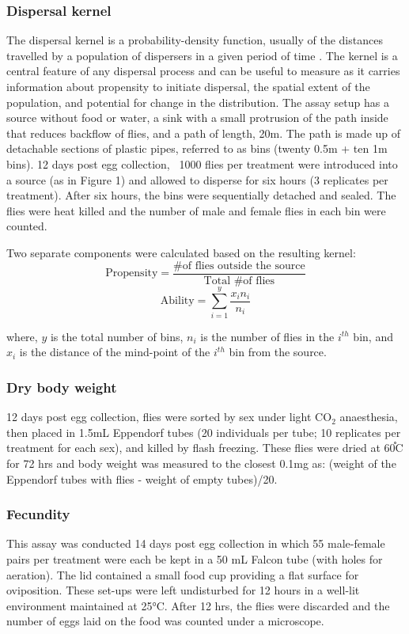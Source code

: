 \documentclass[12pt,onecolumn,twoside]{article}
\begin{document}
	\subsubsection{Dispersal kernel}
	The dispersal kernel is a probability-density function, usually of the distances travelled by a population of dispersers in a given period of time \citep{Clobert2012}. The kernel is a central feature of any dispersal process and can be useful to measure as it carries information about propensity to initiate dispersal, the spatial extent of the population, and potential for change in the distribution.
	The assay setup has a source without food or water, a sink with a small protrusion of the path inside that reduces backflow of flies, and a path of length, 20m. The path is made up of detachable sections of plastic pipes, referred to as bins (twenty 0.5m + ten 1m bins). 12 days post egg collection, ~1000 flies per treatment were introduced into a source (as in Figure 1)  and allowed to disperse for six hours (3 replicates per treatment). After six hours, the bins were sequentially detached and sealed. The flies were heat killed and the number of male and female flies in each bin were counted.

	Two separate components were calculated based on the resulting kernel:
	\[
		\text{Propensity} = \frac{\text{\# of flies outside the source}}{\text{Total \# of flies}}
	\]
	\[
		\text{Ability} = \sum_{i=1}^{y} \frac{x_{i}n_{i}}{n_{i}}
	\]

	where, $y$ is the total number of bins, $n_{i}$ is the number of flies in the $i^{th}$ bin, and $x_{i}$ is the distance of the mind-point of the $i^{th}$ bin from the source.

	\subsubsection{Dry body weight}
	12 days post egg collection, flies were sorted by sex under light CO$_\text{2}$ anaesthesia, then placed in 1.5mL Eppendorf tubes (20 individuals per tube; 10 replicates per treatment for each sex), and killed by flash freezing. These flies were dried at 60֯C for 72 hrs and body weight was measured to the closest 0.1mg as: (weight of the Eppendorf tubes with flies - weight of empty tubes)/20.
	\subsubsection{Fecundity}
	This assay was conducted 14 days post egg collection in which 55 male-female pairs per treatment were each be kept in a 50 mL Falcon tube (with holes for aeration). The lid contained a small food cup providing a flat surface for oviposition. These set-ups were left undisturbed for 12 hours in a well-lit environment maintained at 25°C. After 12 hrs, the flies were discarded and the number of eggs laid on the food was counted under a microscope.
\end{document}
